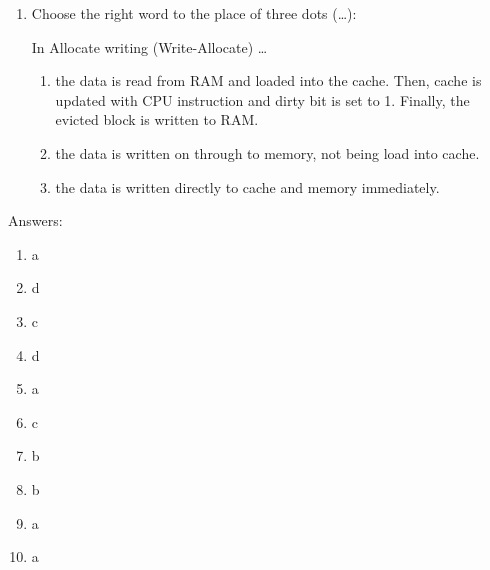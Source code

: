 \documentclass[paper=8.2in:11.6in]{scrartcl}
\begin{document}
\begin{enumerate}
\item Choose the right word to the place of three dots (\ldots):

In Allocate writing (Write-Allocate) \ldots

\begin{enumerate}[label=\alph*)]
\item the data is read from RAM and loaded into the cache. Then, cache is updated with CPU instruction and dirty bit is set to 1. Finally, the evicted block is written to RAM.
\item the data is written on through to memory, not being load into cache.
\item the data is written directly to cache and memory immediately.
\end{enumerate}

\end{enumerate}

\newpage


Answers:

\begin{enumerate}[label=\arabic*)]

\item a
\item d
\item c
\item d
\item a
\item c
\item b
\item b
\item a
\item a


\end{enumerate}
\end{document}
